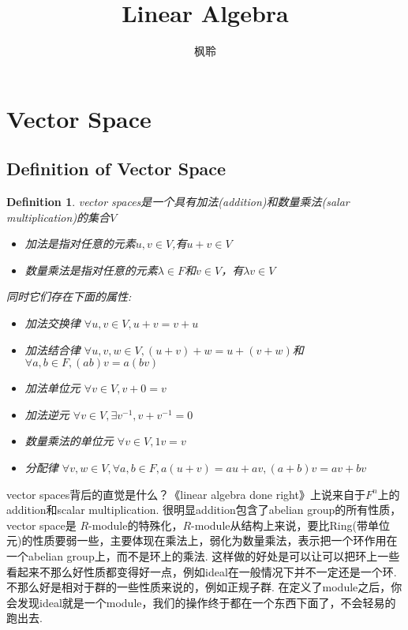 \documentclass{article}
\newtheorem{definition}[theorem]{Definition}
\begin{document}
\title{Linear Algebra}
\author{枫聆}
\maketitle

\tableofcontents
\newpage 
\section{Vector Space}
\subsection{Definition of Vector Space}       

\begin{definition}
\rm vector spaces是一个具有加法(addition)和数量乘法(salar multiplication)的集合$V$

\begin{itemize}
	\item 加法是指对任意的元素$u,v \in V$,有$u+v \in V$
	\item 数量乘法是指对任意的元素$\lambda \in F$和$v \in V$，有$\lambda v \in V$
\end{itemize}

同时它们存在下面的属性:
\begin{itemize}
	\item 加法交换律 $\forall u,v \in V,u+v=v+u$
	\item 加法结合律 $\forall u,v,w \in V ,(u+v)+w=u+(v+w)$和$\forall a,b \in F,(ab)v=a(bv)$
	\item 加法单位元 $\forall v\in V,v+0=v$
	\item 加法逆元 $\forall v \in V,\exists v^{-1} ,v+v^{-1}=0$
	\item 数量乘法的单位元 $\forall v \in V,1v=v$
	\item 分配律 $\forall v,w \in V ,\forall a,b \in F, a(u+v)=au+av,(a+b)v=av+bv$
\end{itemize}
\end{definition}


vector spaces背后的直觉是什么？《linear algebra done right》上说来自于$F^{n}$上的addition和scalar multiplication. 很明显addition包含了abelian group的所有性质，vector space是 $R$-module的特殊化，$R$-module从结构上来说，要比Ring(带单位元)的性质要弱一些，主要体现在乘法上，弱化为数量乘法，表示把一个环作用在一个abelian group上，而不是环上的乘法. 这样做的好处是可以让可以把环上一些看起来不那么好性质都变得好一点，例如ideal在一般情况下并不一定还是一个环. 不那么好是相对于群的一些性质来说的，例如正规子群. 在定义了module之后，你会发现ideal就是一个module，我们的操作终于都在一个东西下面了，不会轻易的跑出去.
\end{document}
